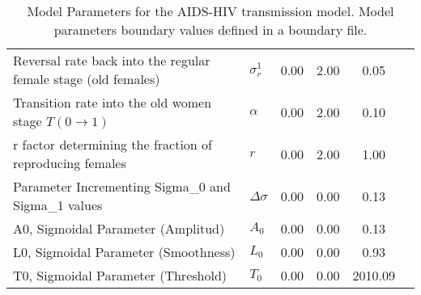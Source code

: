 \begin{table}
\begin{tabular}{p{5cm}lcccc}
Reversal rate back into the regular female stage (old females) & $\sigma^1_r$ & 0.00 & 2.00 & 0.05\\
Transition rate into the old women stage $T(0\rightarrow 1)$ & $\alpha$ & 0.00 & 2.00 & 0.10\\
r factor determining the fraction of reproducing females & $r$ & 0.00 & 2.00 & 1.00\\
Parameter Incrementing Sigma_0 and Sigma_1 values  & $\Delta\sigma$ & 0.00 & 0.00 & 0.13\\
A0, Sigmoidal Parameter (Amplitud) & $A_0$ & 0.00 & 0.00 & 0.13\\
L0, Sigmoidal Parameter (Smoothness) & $L_0$ & 0.00 & 0.00 & 0.93\\
T0, Sigmoidal Parameter (Threshold) & $T_0$ & 0.00 & 0.00 & 2010.09\\
\hline\hline
\end{tabular}
\caption{Model Parameters for the AIDS-HIV transmission model. Model parameters boundary values defined in a boundary file.}
\end{table}
